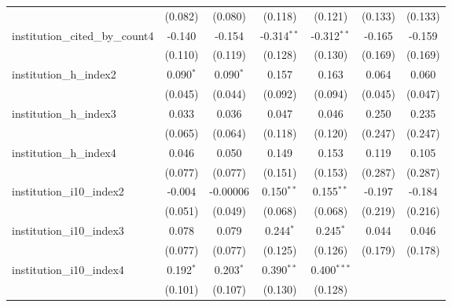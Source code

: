 \begin{tabular}{lcccccc}
                                         & (0.082)        & (0.080)       & (0.118)       & (0.121)       & (0.133)        & (0.133)\\   
   institution\_cited\_by\_count4        & -0.140         & -0.154        & -0.314$^{**}$ & -0.312$^{**}$ & -0.165         & -0.159\\   
                                         & (0.110)        & (0.119)       & (0.128)       & (0.130)       & (0.169)        & (0.169)\\   
   institution\_h\_index2                & 0.090$^{*}$    & 0.090$^{*}$   & 0.157         & 0.163         & 0.064          & 0.060\\   
                                         & (0.045)        & (0.044)       & (0.092)       & (0.094)       & (0.045)        & (0.047)\\   
   institution\_h\_index3                & 0.033          & 0.036         & 0.047         & 0.046         & 0.250          & 0.235\\   
                                         & (0.065)        & (0.064)       & (0.118)       & (0.120)       & (0.247)        & (0.247)\\   
   institution\_h\_index4                & 0.046          & 0.050         & 0.149         & 0.153         & 0.119          & 0.105\\   
                                         & (0.077)        & (0.077)       & (0.151)       & (0.153)       & (0.287)        & (0.287)\\   
   institution\_i10\_index2              & -0.004         & -0.00006      & 0.150$^{**}$  & 0.155$^{**}$  & -0.197         & -0.184\\   
                                         & (0.051)        & (0.049)       & (0.068)       & (0.068)       & (0.219)        & (0.216)\\   
   institution\_i10\_index3              & 0.078          & 0.079         & 0.244$^{*}$   & 0.245$^{*}$   & 0.044          & 0.046\\   
                                         & (0.077)        & (0.077)       & (0.125)       & (0.126)       & (0.179)        & (0.178)\\   
   institution\_i10\_index4              & 0.192$^{*}$    & 0.203$^{*}$   & 0.390$^{**}$  & 0.400$^{***}$ &                &   \\   
                                         & (0.101)        & (0.107)       & (0.130)       & (0.128)       &                &   \\   

\end{tabular}
